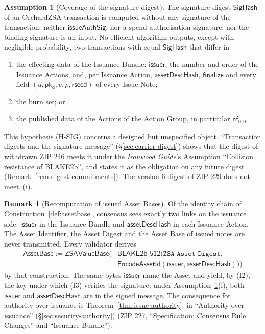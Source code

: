 \documentclass[11pt,a4paper]{article}
\theoremstyle{definition}
\newtheorem{assumption}[theorem]{Assumption}
\newtheorem{remark}[theorem]{Remark}
\newcommand{\nfsym}{\mathsf{nf}}
\newcommand{\pkd}{\ensuremath{\mathsf{pk_d}}}
\begin{document}
\begin{assumption}[Coverage of the signature digest]\label{ass:sighash-cover}
The signature digest $\mathsf{SigHash}$ of an OrchardZSA transaction is
computed without any signature of the transaction: neither
$\mathsf{issueAuthSig}$, nor a spend-authorisation signature, nor the
binding signature is an input. No efficient algorithm outputs, except with
negligible probability, two transactions with equal $\mathsf{SigHash}$ that
differ in
\begin{enumerate}
\item[(i)] the effecting data of the Issuance Bundle: $\mathsf{issuer}$,
  the number and order of the Issuance Actions, and, per Issuance Action,
  $\mathsf{assetDescHash}$, $\mathsf{finalize}$ and every field
  $(d, \pkd, v, \rho, \mathsf{rseed})$ of every Issue Note;
\item[(ii)] the burn set; or
\item[(iii)] the published data of the Actions of the Action Group, in
  particular $\nfsym_{0,0}$.
\end{enumerate}
This hypothesis (H-SIG) concerns a designed but unspecified object.
``Transaction digests and the signature message''
(\S\ref{sec:carrier-digest}) shows that the digest of withdrawn ZIP 246 meets it
under the \emph{Ironwood
Guide}'s Assumption ``Collision resistance of BLAKE2b'', and states it as
the obligation on any future digest (Remark~\ref{rem:digest-commitments}).
The version-$6$ digest of ZIP 229 does not meet~(i).
\end{assumption}

\begin{remark}[Recomputation of issued Asset Bases]
\label{rem:assetbase-recompute}
Of the identity chain of Construction~\ref{def:assetbase}, consensus sees
exactly two links on the issuance side: $\mathsf{issuer}$ in the Issuance
Bundle and $\mathsf{assetDescHash}$ in each Issuance Action. The Asset
Identifier, the Asset Digest and the Asset Base of issued notes are never
transmitted. Every validator derives
\begin{align*}
  \mathsf{AssetBase} := \mathsf{ZSAValueBase}\bigl(
    &\mathsf{BLAKE2b\text{-}512}(\texttt{ZSA-Asset-Digest}, \\
    &\mathsf{EncodeAssetId}(\mathsf{issuer}, \mathsf{assetDescHash}))\bigr)
\end{align*}
by that construction. The same bytes $\mathsf{issuer}$ name the Asset and
yield, by (I2), the key under which (I3) verifies the signature; under
Assumption~\ref{ass:sighash-cover}(i), both $\mathsf{issuer}$ and
$\mathsf{assetDescHash}$ are in the signed message. The consequence for
authority over issuance is Theorem~\ref{thm:issue-authority}, in
``Authority over issuance'' (\S\ref{sec:security-authority}) (ZIP 227,
``Specification: Consensus Rule Changes'' and ``Issuance Bundle'').
\end{remark}
\end{document}
